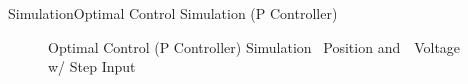 \documentclass{beamer}
\begin{document}
\begin{frame}{Simulation}{Optimal Control Simulation (P Controller)}
    \begin{figure}
      \centering
      \caption{Optimal Control (P Controller) Simulation ~Position and~~Voltage w/ Step Input}
      \label{fig:LQR_Sim_Con}
    \end{figure}
\end{frame}
\end{document}
